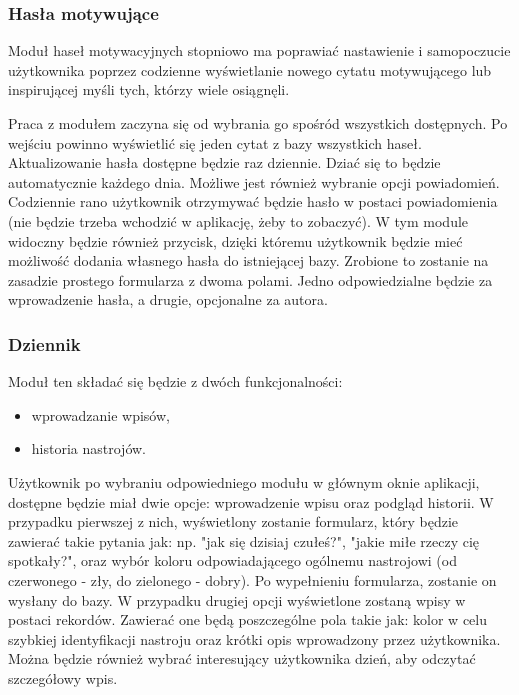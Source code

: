 \subsubsection*{Hasła motywujące}
Moduł haseł motywacyjnych stopniowo ma poprawiać nastawienie i samopoczucie
użytkownika poprzez codzienne wyświetlanie nowego cytatu motywującego lub
inspirującej myśli tych, którzy wiele osiągnęli.

Praca z modułem zaczyna się od wybrania go spośród wszystkich dostępnych. Po
wejściu powinno wyświetlić się jeden cytat z bazy wszystkich haseł.
Aktualizowanie hasła dostępne będzie raz dziennie. Dziać się to będzie
automatycznie każdego dnia. Możliwe jest również wybranie opcji powiadomień.
Codziennie rano użytkownik otrzymywać będzie hasło w postaci powiadomienia (nie
będzie trzeba wchodzić w aplikację, żeby to zobaczyć). W tym module widoczny
będzie również przycisk, dzięki któremu użytkownik będzie mieć możliwość dodania
własnego hasła do istniejącej bazy. Zrobione to zostanie na zasadzie prostego
formularza z dwoma polami. Jedno odpowiedzialne będzie za wprowadzenie hasła, a
drugie, opcjonalne za autora.

\subsubsection*{Dziennik}
Moduł ten składać się będzie z dwóch funkcjonalności:
\begin{itemize}
    \item wprowadzanie wpisów,
    \item historia nastrojów.
\end{itemize}
Użytkownik po wybraniu odpowiedniego modułu w głównym oknie aplikacji, dostępne
będzie miał dwie opcje: wprowadzenie wpisu oraz podgląd historii. W przypadku
pierwszej z nich, wyświetlony zostanie formularz, który będzie zawierać takie
pytania jak: np. "jak się dzisiaj czułeś?", "jakie miłe rzeczy cię spotkały?",
oraz wybór koloru odpowiadającego ogólnemu nastrojowi (od czerwonego - zły, do
zielonego - dobry). Po wypełnieniu formularza, zostanie on wysłany do bazy. W
przypadku drugiej opcji wyświetlone zostaną wpisy w postaci rekordów. Zawierać
one będą poszczególne pola takie jak: kolor w celu szybkiej identyfikacji
nastroju oraz krótki opis wprowadzony przez użytkownika. Można będzie również
wybrać interesujący użytkownika dzień, aby odczytać szczegółowy wpis.

